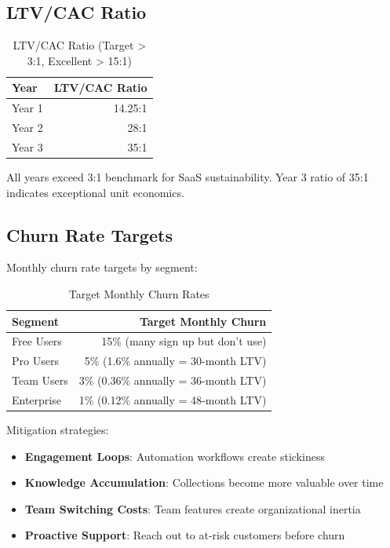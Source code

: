 \documentclass{report}
\begin{document}
\subsection{LTV/CAC Ratio}

\begin{table}[h]
\centering
\begin{tabular}{|l|r|}
\toprule
\textbf{Year} & \textbf{LTV/CAC Ratio} \\
\midrule
Year 1 & 14.25:1 \\
Year 2 & 28:1 \\
Year 3 & 35:1 \\
\bottomrule
\end{tabular}
\caption{LTV/CAC Ratio (Target > 3:1, Excellent > 15:1)}
\end{table}

All years exceed 3:1 benchmark for SaaS sustainability. Year 3 ratio of 35:1 indicates exceptional unit economics.

\subsection{Churn Rate Targets}

Monthly churn rate targets by segment:

\begin{table}[h]
\centering
\begin{tabular}{|l|r|}
\toprule
\textbf{Segment} & \textbf{Target Monthly Churn} \\
\midrule
Free Users & 15\% (many sign up but don't use) \\
Pro Users & 5\% (1.6\% annually = 30-month LTV) \\
Team Users & 3\% (0.36\% annually = 36-month LTV) \\
Enterprise & 1\% (0.12\% annually = 48-month LTV) \\
\bottomrule
\end{tabular}
\caption{Target Monthly Churn Rates}
\end{table}

Mitigation strategies:
\begin{itemize}
    \item \textbf{Engagement Loops}: Automation workflows create stickiness
    \item \textbf{Knowledge Accumulation}: Collections become more valuable over time
    \item \textbf{Team Switching Costs}: Team features create organizational inertia
    \item \textbf{Proactive Support}: Reach out to at-risk customers before churn
\end{itemize}
\end{document}
